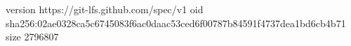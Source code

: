 version https://git-lfs.github.com/spec/v1
oid sha256:02ae0328ca5c6745083f6ac0daac53ced6f00787b84591f4737dea1bd6cb4b71
size 2796807
